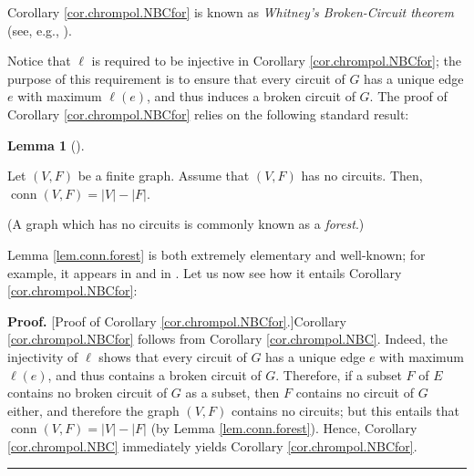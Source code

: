 \documentclass[numbers=enddot,12pt,final,onecolumn,notitlepage]{scrartcl}%
\theoremstyle{definition}
\newtheorem{lem}[theo]{Lemma}
\newenvironment{lemma}[1][]
{\begin{lem}[#1]\begin{leftbar}}
{\end{leftbar}\end{lem}}
\newenvironment{proof}[1][Proof]{\noindent\textbf{#1.} }{\ \rule{0.5em}{0.5em}}
\newenvironment{verlong}{}{}
\newenvironment{vershort}{}{}
\begin{document}
Corollary \ref{cor.chrompol.NBCfor} is known as \textit{Whitney's
Broken-Circuit theorem} (see, e.g., \cite{BlaSag86}).

Notice that $\ell$ is required to be injective in Corollary
\ref{cor.chrompol.NBCfor}; the purpose of this requirement is to ensure that
every circuit of $G$ has a unique edge $e$ with maximum $\ell\left(  e\right)
$, and thus induces a broken circuit of $G$. The proof of Corollary
\ref{cor.chrompol.NBCfor} relies on the following standard result:

\begin{lemma}
\label{lem.conn.forest}Let $\left(  V,F\right)  $ be a finite graph. Assume
that $\left(  V,F\right)  $ has no circuits. Then, $\operatorname*{conn}%
\left(  V,F\right)  =\left\vert V\right\vert -\left\vert F\right\vert $.
\end{lemma}

(A graph which has no circuits is commonly known as a \textit{forest}.)

\begin{verlong}
[TODO: Write a proof of Lemma \ref{lem.conn.forest}.]
\end{verlong}

Lemma \ref{lem.conn.forest} is both extremely elementary and well-known; for
example, it appears in \cite[Proposition 10.6]{Bona11} and in \cite[\S I.2,
Corollary 6]{Bollobas}. Let us now see how it entails Corollary
\ref{cor.chrompol.NBCfor}:

\begin{vershort}
\begin{proof}
[Proof of Corollary \ref{cor.chrompol.NBCfor}.]Corollary
\ref{cor.chrompol.NBCfor} follows from Corollary \ref{cor.chrompol.NBC}.
Indeed, the injectivity of $\ell$ shows that every circuit of $G$ has a unique
edge $e$ with maximum $\ell\left(  e\right)  $, and thus contains a broken
circuit of $G$. Therefore, if a subset $F$ of $E$ contains no broken circuit
of $G$ as a subset, then $F$ contains no circuit of $G$ either, and therefore
the graph $\left(  V,F\right)  $ contains no circuits; but this entails that
$\operatorname*{conn}\left(  V,F\right)  =\left\vert V\right\vert -\left\vert
F\right\vert $ (by Lemma \ref{lem.conn.forest}). Hence, Corollary
\ref{cor.chrompol.NBC} immediately yields Corollary \ref{cor.chrompol.NBCfor}.
\end{proof}
\end{vershort}
\end{document}
